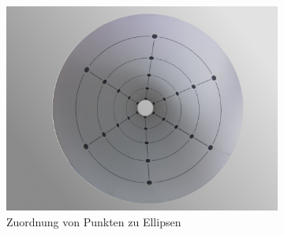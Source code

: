 \begin{figure}[!htb]
	\centering
	\begin{subfigure}{.5\textwidth}
		\centering
		\includegraphics[width=.9\textwidth]{images/coneRasp.jpg}
		\caption{Zuordnung von Punkten zu Ellipsen}
		\label{fig:ellipseMapping}
	\end{subfigure}%
	\begin{subfigure}{.5\textwidth}
		\centering

\end{subfigure}
\end{figure}
